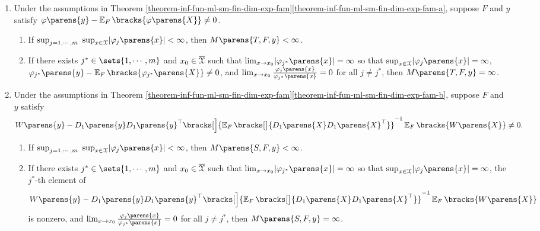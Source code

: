 \begin{corollary}\label{corollary-inffun-fin-dim-exp-fam-bounded}
	\leavevmode
	\begin{enumerate}[label=(\alph*)]
		\item \label{corollary-inffun-fin-dim-exp-fam-bounded-a} Under the assumptions in Theorem \ref{theorem-inf-fun-ml-sm-fin-dim-exp-fam}\ref{theorem-inf-fun-ml-sm-fin-dim-exp-fam-a}, suppose $F$ and $y$ satisfy $\varphi \parens{y} - \E_F \bracks{\varphi \parens{X}} \neq 0$. 
		\begin{enumerate}[label=(\roman*)]
			\item If $\sup_{j = 1, \cdots, m} \ \sup_{x \in \calX} \abs{\varphi_j \parens{x}} < \infty$, then $M \parens{T, F, y} < \infty$. 
			\item If there exists $j^* \in \sets{1, \cdots, m}$ and $x_0 \in \overline{\mathcal{X}}$ such that $\lim_{x \to x_0} \abs{\varphi_{j^*} \parens{x}} = \infty$ so that $\sup_{x \in \calX} \abs{\varphi_j \parens{x}} = \infty$, $\varphi_{j^*} \parens{y} - \E_F \bracks{\varphi_{j^*} \parens{X}} \neq 0$, and $\lim_{x \to x_0} \frac{\varphi_j \parens{x}}{\varphi_{j^*} \parens{x}} = 0$ for all $j \neq j^*$, then $M \parens{T, F, y} = \infty$. 
		\end{enumerate}
		
		\item \label{corollary-inffun-fin-dim-exp-fam-bounded-b} Under the assumptions in Theorem \ref{theorem-inf-fun-ml-sm-fin-dim-exp-fam}\ref{theorem-inf-fun-ml-sm-fin-dim-exp-fam-b}, suppose $F$ and $y$ satisfy 
		\begin{align*}
			W \parens{y} - D_1 \parens{y} D_1 \parens{y}^\top \bracks[\Big]{\E_F \bracks[\big]{D_1 \parens{X} D_1 \parens{X}^\top} }^{-1} \E_F \bracks{W \parens{X}} \neq 0. 
		\end{align*}
		\begin{enumerate}[label=(\roman*)]
			\item If $\sup_{j = 1, \cdots, m} \ \sup_{x \in \calX} \abs{\varphi_j \parens{x}} < \infty$, then $M \parens{S, F, y} < \infty$. 
			\item If there exists $j^* \in \sets{1, \cdots, m}$ and $x_0 \in \overline{\mathcal{X}}$ such that $\lim_{x \to x_0} \abs{\varphi_{j^*} \parens{x}} = \infty$ so that $\sup_{x \in \calX} \abs{\varphi_j \parens{x}} = \infty$, the $j^*$-th element of 
			\begin{align*}
				W \parens{y} - D_1 \parens{y} D_1 \parens{y}^\top \bracks[\Big]{\E_F \bracks[\big]{D_1 \parens{X} D_1 \parens{X}^\top} }^{-1} \E_F \bracks{W \parens{X}}
			\end{align*}
			is nonzero, and $\lim_{x \to x_0} \frac{\varphi_j \parens{x}}{\varphi_{j^*} \parens{x}} = 0$ for all $j \neq j^*$, then $M \parens{S, F, y} = \infty$. 
		\end{enumerate}
	\end{enumerate}
\end{corollary}

